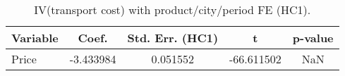 \begin{table}[H]
\centering
\begin{tabular}{lcccc}
\toprule
Variable & Coef. & Std. Err. (HC1) & t & p-value \\
\midrule
Price & -3.433984 & 0.051552 & -66.611502 & NaN \\
\bottomrule
\end{tabular}
\caption{IV(transport cost) with product/city/period FE (HC1).}
\label{tab:q13_iv_fe_price}
\end{table}
